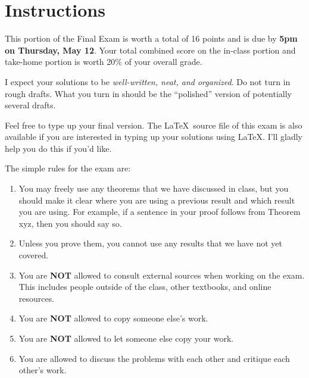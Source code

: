 \documentclass[11pt]{scrartcl}
\theoremstyle{definition}
\begin{document}
\begin{center}

  
  \bigskip
  

\end{center}

\section*{Instructions}

This portion of the Final Exam is worth a total of 16 points and is due by \textbf{5pm on Thursday, May 12}.  Your total combined score on the in-class portion and take-home portion is worth 20\% of your overall grade.  

\bigskip

I expect your solutions to be \emph{well-written, neat, and organized}.  Do not turn in rough drafts.  What you turn in should be the ``polished'' version of potentially several drafts.  
 
\bigskip

Feel free to type up your final version.  The \LaTeX\ source file of this exam is also available if you are interested in typing up your solutions using \LaTeX.  I'll gladly help you do this if you'd like.

\bigskip

The simple rules for the exam are:

\begin{enumerate}
\item You may freely use any theorems that we have discussed in class, but you should make it clear where you are using a previous result and which result you are using.  For example, if a sentence in your proof follows from Theorem xyz, then you should say so. 
\item Unless you prove them, you cannot use any results that we have not yet covered.
\item You are \textbf{NOT} allowed to consult external sources when working on the exam.  This includes people outside of the class, other textbooks, and online resources.
\item You are \textbf{NOT} allowed to copy someone else's work.
\item You are \textbf{NOT} allowed to let someone else copy your work.
\item You are allowed to discuss the problems with each other and critique each other's work.
\end{enumerate}
\end{document}
